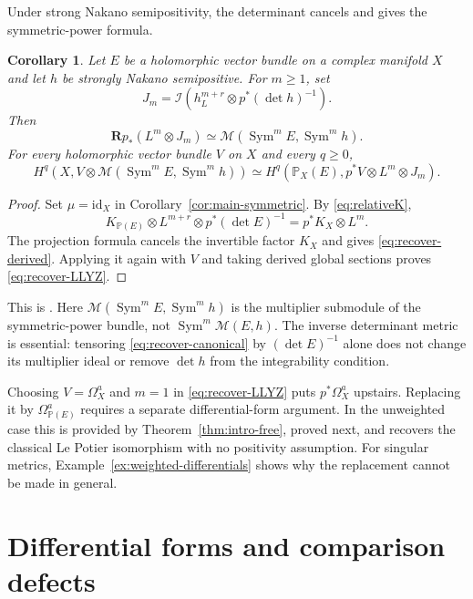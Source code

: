 \documentclass[11pt,reqno]{amsart}
\numberwithin{equation}{section}
\newtheorem{corollary}[theorem]{Corollary}
\theoremstyle{definition}
\theoremstyle{remark}
\newcommand{\MM}{\mathcal M}
\newcommand{\II}{\mathcal I}
\newcommand{\PP}{\mathbb P}
\newcommand{\RR}{\mathbf R}
\newcommand{\Sym}{\operatorname{Sym}}
\begin{document}
Under strong Nakano semipositivity, the determinant cancels and gives the symmetric-power formula.
\begin{corollary}\label{cor:recover-LLYZ}
Let $E$ be a holomorphic vector bundle on a complex manifold $X$ and let $h$ be strongly Nakano semipositive. For $m\geq1$, set
\[
 J_m=\II(h_L^{m+r}\otimes p^*(\det h)^{-1}).
\]
Then
\begin{equation}\label{eq:recover-derived}
 \RR p_*(L^m\otimes J_m)
       \simeq\MM(\Sym^mE,\Sym^mh).
\end{equation}
For every holomorphic vector bundle $V$ on $X$ and every $q\geq0$,
\begin{equation}\label{eq:recover-LLYZ}
 H^q(X,V\otimes\MM(\Sym^mE,\Sym^mh))
 \simeq H^q(\PP_X(E),p^*V\otimes L^m\otimes J_m).
\end{equation}
\end{corollary}
\begin{proof}
Set $\mu=\mathrm{id}_X$ in Corollary~\ref{cor:main-symmetric}. By \eqref{eq:relativeK},
\[
 K_{\PP(E)}\otimes L^{m+r}\otimes p^*(\det E)^{-1}
       =p^*K_X\otimes L^m.
\]
The projection formula cancels the invertible factor $K_X$ and gives \eqref{eq:recover-derived}. Applying it again with $V$ and taking derived global sections proves \eqref{eq:recover-LLYZ}.
\end{proof}
This is \cite[Theorem 1.3(i)]{LLYZpre}. Here $\MM(\Sym^mE,\Sym^mh)$ is the multiplier submodule of the symmetric-power bundle, not $\Sym^m\MM(E,h)$. The inverse determinant metric is essential: tensoring \eqref{eq:recover-canonical} by $(\det E)^{-1}$ alone does not change its multiplier ideal or remove $\det h$ from the integrability condition.

Choosing $V=\Omega_X^a$ and $m=1$ in \eqref{eq:recover-LLYZ} puts $p^*\Omega_X^a$ upstairs. Replacing it by $\Omega_{\PP(E)}^a$ requires a separate differential-form argument. In the unweighted case this is provided by Theorem~\ref{thm:intro-free}, proved next, and recovers the classical Le Potier isomorphism with no positivity assumption. For singular metrics, Example~\ref{ex:weighted-differentials} shows why the replacement cannot be made in general.

\section{Differential forms and comparison defects}\label{sec:unweighted}
\end{document}
